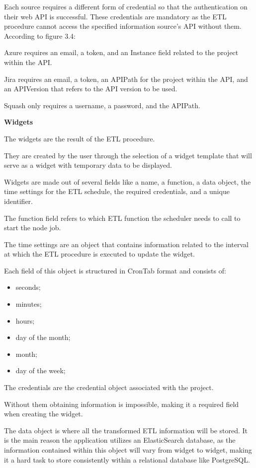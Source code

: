 \documentclass[a4paper,twoside,10pt]{report}
\begin{document}
Each source requires a different form of credential so that the authentication on their web API is successful. These credentials are mandatory as the ETL procedure cannot access the specified information source's API without them.
\newline
According to figure 3.4:
\newline

Azure requires an email, a token, and an Instance field related to the project within the API.

Jira requires an email, a token, an APIPath for the project within the API, and an APIVersion that refers to the API version to be used.

Squash only requires a username, a password, and the APIPath.

\newpage

\textbf{Widgets}

The widgets are the result of the ETL procedure.

They are created by the user through the selection of a widget template that will serve as a widget with temporary data to be displayed.

Widgets are made out of several fields like a name, a function, a data object, the time settings for the ETL schedule, the required credentials, and a unique identifier.

The function field refers to which ETL function the scheduler needs to call to start the node job.

The time settings are an object that contains information related to the interval at which the ETL procedure is executed to update the widget. 

Each field of this object is structured in CronTab format and consists of:
\begin{itemize}
  \item seconds;
  \item minutes;
  \item hours;
  \item day of the month;
  \item month;
  \item day of the week;
\end{itemize}
The credentials are the credential object associated with the project.

Without them obtaining information is impossible, making it a required field when creating the widget.

The data object is where all the transformed ETL information will be stored. It is the main reason the application utilizes an ElasticSearch database, as the information contained within this object will vary from widget to widget, making it a hard task to store consistently within a relational database like PostgreSQL.
\end{document}

